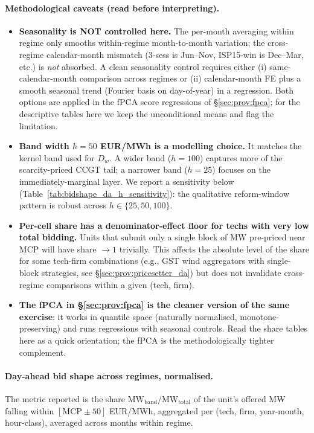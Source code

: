 \documentclass[11pt,a4paper]{article}
\begin{document}
\paragraph{Methodological caveats (read before interpreting).}
\begin{itemize}
\item \textbf{Seasonality is NOT controlled here.} The per-month averaging within regime only smooths within-regime month-to-month variation; the cross-regime calendar-month mismatch (3-sess is Jun--Nov, ISP15-win is Dec--Mar, etc.) is \emph{not} absorbed. A clean seasonality control requires either (i) same-calendar-month comparison across regimes or (ii) calendar-month FE plus a smooth seasonal trend (Fourier basis on day-of-year) in a regression. Both options are applied in the fPCA score regressions of \S\ref{sec:prov:fpca}; for the descriptive tables here we keep the unconditional means and flag the limitation.
\item \textbf{Band width $h = 50$ EUR/MWh is a modelling choice.} It matches the kernel band used for $D_w$. A wider band ($h = 100$) captures more of the scarcity-priced CCGT tail; a narrower band ($h = 25$) focuses on the immediately-marginal layer. We report a sensitivity below (Table~\ref{tab:bidshape_da_h_sensitivity}): the qualitative reform-window pattern is robust across $h \in \{25, 50, 100\}$.
\item \textbf{Per-cell share has a denominator-effect floor for techs with very low total bidding.} Units that submit only a single block of MW pre-priced near MCP will have share $\to 1$ trivially. This affects the absolute level of the share for some tech-firm combinations (e.g., GST wind aggregators with single-block strategies, see \S\ref{sec:prov:pricesetter_da}) but does not invalidate cross-regime comparisons within a given (tech, firm).
\item \textbf{The fPCA in \S\ref{sec:prov:fpca} is the cleaner version of the same exercise}: it works in quantile space (naturally normalised, monotone-preserving) and runs regressions with seasonal controls. Read the share tables here as a quick orientation; the fPCA is the methodologically tighter complement.
\end{itemize}

\paragraph{Day-ahead bid shape across regimes, normalised.} The metric reported is the share $\text{MW}_{\text{band}} / \text{MW}_{\text{total}}$ of the unit's offered MW falling within $[\text{MCP} \pm 50]$ EUR/MWh, aggregated per (tech, firm, year-month, hour-class), averaged across months within regime.
\end{document}

